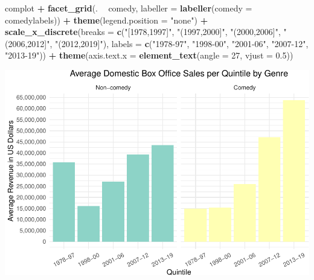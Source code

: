 \documentclass[]{article}
\newenvironment{Shaded}{\begin{snugshade}}{\end{snugshade}}
\newcommand{\DataTypeTok}[1]{\textcolor[rgb]{0.13,0.29,0.53}{#1}}
\newcommand{\DecValTok}[1]{\textcolor[rgb]{0.00,0.00,0.81}{#1}}
\newcommand{\FloatTok}[1]{\textcolor[rgb]{0.00,0.00,0.81}{#1}}
\newcommand{\KeywordTok}[1]{\textcolor[rgb]{0.13,0.29,0.53}{\textbf{#1}}}
\newcommand{\NormalTok}[1]{#1}
\newcommand{\OperatorTok}[1]{\textcolor[rgb]{0.81,0.36,0.00}{\textbf{#1}}}
\newcommand{\StringTok}[1]{\textcolor[rgb]{0.31,0.60,0.02}{#1}}
\begin{document}
\begin{Shaded}
\begin{Highlighting}[]
\NormalTok{complot }\OperatorTok{+}\StringTok{ }\KeywordTok{facet_grid}\NormalTok{(. }\OperatorTok{~}\StringTok{ }\NormalTok{comedy, }\DataTypeTok{labeller =} \KeywordTok{labeller}\NormalTok{(}\DataTypeTok{comedy =}\NormalTok{ comedylabels)) }\OperatorTok{+}\StringTok{ }
\StringTok{    }\KeywordTok{theme}\NormalTok{(}\DataTypeTok{legend.position =} \StringTok{"none"}\NormalTok{) }\OperatorTok{+}\StringTok{ }\KeywordTok{scale_x_discrete}\NormalTok{(}\DataTypeTok{breaks =} \KeywordTok{c}\NormalTok{(}\StringTok{"[1978,1997]"}\NormalTok{, }
    \StringTok{"(1997,2000]"}\NormalTok{, }\StringTok{"(2000,2006]"}\NormalTok{, }\StringTok{"(2006,2012]"}\NormalTok{, }\StringTok{"(2012,2019]"}\NormalTok{), }
    \DataTypeTok{labels =} \KeywordTok{c}\NormalTok{(}\StringTok{"1978-97"}\NormalTok{, }\StringTok{"1998-00"}\NormalTok{, }\StringTok{"2001-06"}\NormalTok{, }\StringTok{"2007-12"}\NormalTok{, }\StringTok{"2013-19"}\NormalTok{)) }\OperatorTok{+}\StringTok{ }
\StringTok{    }\KeywordTok{theme}\NormalTok{(}\DataTypeTok{axis.text.x =} \KeywordTok{element_text}\NormalTok{(}\DataTypeTok{angle =} \DecValTok{27}\NormalTok{, }\DataTypeTok{vjust =} \FloatTok{0.5}\NormalTok{))}
\end{Highlighting}
\end{Shaded}

\begin{center}\includegraphics{project1.ethanpieniazekweb_files/figure-latex/unnamed-chunk-15-1} \end{center}
\end{document}
